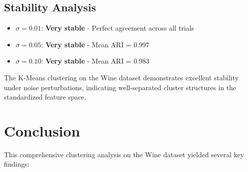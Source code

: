 \documentclass[12pt,a4paper]{article}
\begin{document}
\subsection{Stability Analysis}

\begin{itemize}
    \item $\sigma = 0.01$: \textbf{Very stable} - Perfect agreement across all trials
    \item $\sigma = 0.05$: \textbf{Very stable} - Mean ARI = 0.997
    \item $\sigma = 0.10$: \textbf{Very stable} - Mean ARI = 0.983
\end{itemize}

The K-Means clustering on the Wine dataset demonstrates excellent stability under noise perturbations, indicating well-separated cluster structures in the standardized feature space.

\section{Conclusion}

This comprehensive clustering analysis on the Wine dataset yielded several key findings:
\end{document}

